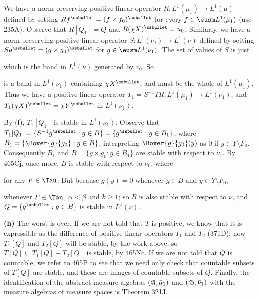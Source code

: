 {We have a norm-preserving positive linear operator
$R:L^1(\mu_1)\to L^1(\mu)$ defined by setting
$Rf^{\ssbullet}=(f\times f_0)^{\ssbullet}$
for every $f\in\eusm L^1(\mu_1)$ (use 235A).   Observe that $R[Q_1]=Q$
and $R(\chi X)^{\ssbullet}=u_0$.   Similarly, we have a norm-preserving
positive linear operator $S:L^1(\nu_1)\to L^1(\nu)$ defined by setting
$Sg^{\ssbullet}=(g\times g_0)^{\ssbullet}$ for $g\in\eusm L^1(\nu_1)$.
The set of values of $S$ is just


\noindent which is the band in $L^1(\nu)$ generated by $v_0$.   So


\noindent is a band in $L^1(\nu_1)$ containing $\chi X^{\ssbullet}$, and
must be the whole of $L^1(\mu_1)$.   Thus we have a positive linear
operator $T_1=S^{-1}TR:L^1(\mu_1)\to L^1(\nu_1)$, and $T_1(\chi
X)^{\ssbullet}=\chi Y^{\ssbullet}$ in $L^1(\nu_1)$.

By (f), $T_1[Q_1]$ is stable in $L^1(\nu_1)$.   Observe that
$T_1[Q_1]=\{S^{-1}g^{\ssbullet}:g\in B\}=\{g^{\ssbullet}:g\in B_1\}$,
where $B_1=\{\Bover{g}{g_0}:g\in B\}$, interpreting $\Bover{g}{g_0}(y)$
as $0$ if $y\in Y\setminus F_0$.   Consequently $B_1$ and
$B=\{g\times g_0:g\in B_1\}$ are stable with respect to $\nu_1$.   By 465Cj, once
more, $B$ is stable with respect to $\nu_0$, where


\noindent for any $F\in\Tau$.   But because $g(y)=0$ whenever $g\in B$
and $y\in Y\setminus F_0$,


\noindent whenever $F\in\Tau$, $\alpha<\beta$ and $k\ge 1$;  so $B$ is
also stable with respect to $\nu$, and $Q=\{g^{\ssbullet}:g\in B\}$ is
stable in $L^1(\nu)$.\ \Qed

\medskip

{\bf (h)} The worst is over.   If we are not told that $T$ is positive,
we know that it is expressible as the difference of positive linear
operators $T_1$ and $T_2$ (371D);  now $T_1[Q]$ and $T_2[Q]$ will be
stable, by the work above, so $T[Q]\subseteq T_1[Q]-T_2[Q]$ is stable,
by 465Nc.   If we are not told that $Q$ is countable, we refer to 465P
to see that we need only check that countable subsets of $T[Q]$ are
stable, and these are images of countable subsets of $Q$.   Finally, the
identification of the abstract measure algebras $(\frak A,\bar\mu_1)$
and $(\frak B,\bar\nu_1)$ with the measure algebras of measure spaces
is Theorem 321J.
}%

